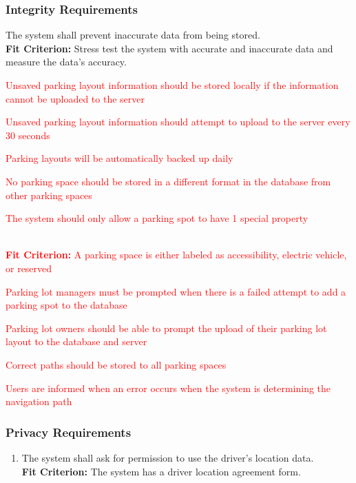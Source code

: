 \documentclass[12pt,letterpaper]{article}
\begin{document}
\subsubsection{Integrity Requirements}
\begin{enumerate}[resume*] 
    \item The system shall prevent inaccurate data from being stored.
    \label{isr4}\\
    \textbf{Fit Criterion:} Stress test the system with accurate and inaccurate
    data and measure the data's accuracy. \textcolor{red}{\item Unsaved parking
    layout information should be stored locally if the information cannot be
    uploaded to the server} \label{isr5} \textcolor{red}{\item Unsaved parking
    layout information should attempt to upload to the server every 30 seconds}
    \label{isr6} \textcolor{red}{\item Parking layouts will be automatically
    backed up daily} \label{isr7} \textcolor{red}{\item No parking space should
    be stored in a different format in the database from other parking spaces}
    \label{isr8} \textcolor{red}{\item The system should only allow a parking
    spot to have 1 special property} \label{isr9}\\
    \textcolor{red}{\textbf{Fit Criterion:} A parking space is either labeled as
    accessibility, electric vehicle, or reserved} \textcolor{red}{\item Parking
    lot managers must be prompted when there is a failed attempt to add a
    parking spot to the database} \label{isr10} \textcolor{red}{\item Parking
    lot owners should be able to prompt the upload of their parking lot layout
    to the database and server} \label{isr11} \textcolor{red}{\item Correct
    paths should be stored to all parking spaces} \label{isr12}
    \textcolor{red}{\item Users are informed when an error occurs when the
    system is determining the navigation path} \label{isr13}
\end{enumerate}

\subsubsection{Privacy Requirements}
\begin{enumerate}[resume*] 
    \item The system shall ask for permission to use the driver's location
    data.\\
    \textbf{Fit Criterion:} The system has a driver location agreement form.
\end{enumerate}
\end{document}
